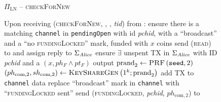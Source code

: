   \begin{figure}[H]
    \begin{protocolbox}{$\Pi_{\mathrm{LN}}$ -- \textsc{checkForNew}}
      \begin{algorithmic}[1]
        \State Upon receiving (\textsc{checkForNew}, \alice, \bob, \textit{tid})
        from \environment: 
        \Indent
          \State ensure there is a matching \texttt{channel} in
          \texttt{pendingOpen} with id \textit{pchid}, with a ``broadcast''
          and a ``no \textsc{fundingLocked}'' mark, funded with $x$ coins
          \label{alg:protocol:checkForNew:valid}
          \State send (\textsc{read}) to \ledger{} and assign reply to
          $\Sigma_{\mathit{Alice}}$
          \label{alg:protocol:checkForNew:read}
          \State ensure $\exists$ unspent TX in $\Sigma_{\mathit{Alice}}$ with ID
          \textit{pchid} and a $\left(x, ph_F \wedge pt_F\right)$ output
          \label{alg:protocol:checkForNew:included}
          \State $\mathrm{prand}_2 \gets \textsc{PRF}\left(\mathtt{seed},
          2\right)$
          \label{alg:protocol:checkForNew:prand}
          \State $\left(ph_{\mathrm{com}, 2}, sh_{\mathrm{com}, 2}\right) \gets
          \textsc{KeyShareGen}\left(1^k; \mathrm{prand}_2\right)$
          \State add TX to \texttt{channel} data
          \State replace ``broadcast'' mark in \texttt{channel} with
          ``\textsc{fundingLocked} sent''
          \State send (\textsc{fundingLocked}, \textit{pchid},
          $ph_{\mathrm{com}, 2}$) to \bob{}
          \label{alg:protocol:checkForNew:send}
        \EndIndent
      \end{algorithmic}
    \end{protocolbox}
    \caption{}
    \label{alg:protocol:checkForNew}
  \end{figure}

